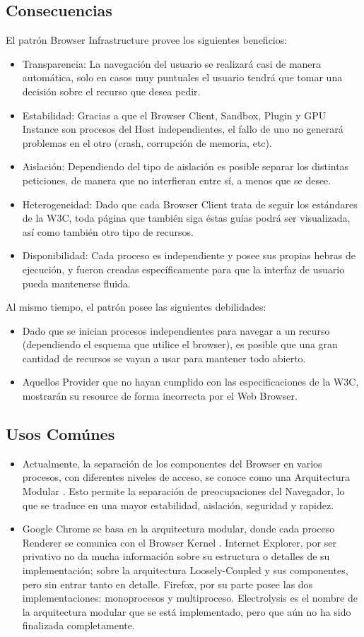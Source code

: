 \subsection{Consecuencias}
El patrón Browser Infrastructure provee los siguientes beneficios:
\begin{itemize}
	\item Transparencia: La navegación del usuario se realizará casi de manera automática, solo en casos muy puntuales el usuario tendrá que tomar una decisión sobre el recurso que desea pedir.
	\item Estabilidad: Gracias a que el Browser Client, Sandbox, Plugin y GPU Instance son procesos del Host independientes, el fallo de uno no generará problemas en el otro (crash, corrupción de memoria, etc).
	\item Aislación: Dependiendo del tipo de aislación es posible separar los distintas peticiones, de manera que no interfieran entre sí, a menos que se desee.
	\item Heterogeneidad: Dado que cada Browser Client trata de seguir los estándares de la W3C, toda página que también siga éstas guías podrá ser visualizada, así como también otro tipo de recursos.
	\item Disponibilidad: Cada proceso es independiente y posee sus propias hebras de ejecución, y fueron creadas específicamente para que la interfaz de usuario pueda mantenerse fluida.
\end{itemize}
Al mismo tiempo, el patrón posee las siguientes debilidades:
\begin{itemize}
	\item Dado que se inician procesos independientes para navegar a un recurso (dependiendo el esquema que utilice el browser), es posible que una gran cantidad de recursos se vayan a usar para mantener todo abierto.
	\item Aquellos Provider que no hayan cumplido con las especificaciones de la W3C, mostrarán su resource de forma incorrecta por el Web Browser.
\end{itemize}
\subsection{Usos Comúnes}
\begin{itemize}
	\item Actualmente, la separación de los componentes del Browser en varios procesos, con diferentes niveles de acceso, se conoce como una Arquitectura Modular \cite{Vrbanec2013}. Esto permite la separación de preocupaciones del Navegador, lo que se traduce en una mayor estabilidad, aislación, seguridad y rapidez.
	\item Google Chrome se basa en la arquitectura modular, donde cada proceso Renderer se comunica con el Browser Kernel \cite{multiProcGC}. Internet Explorer, por ser privativo no da mucha información sobre su estructura o detalles de su implementación; \cite{Crowley2010} sobre la arquitectura Loosely-Coupled \cite{IE8-LCIE} y sus componentes, pero sin entrar tanto en detalle. Firefox, por su parte posee las dos implementaciones: monoprocesos y multiproceso. Electrolysis es el nombre de la arquitectura modular que se está implementado, pero que aún no ha sido finalizada completamente.
\end{itemize}
